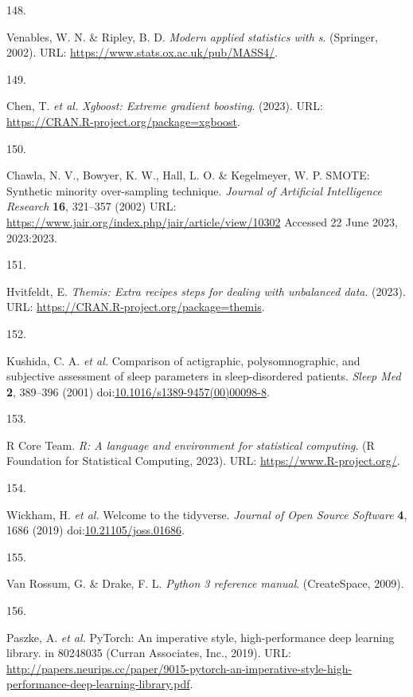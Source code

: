 \documentclass[
  10pt,
]{scrbook}
\newlength{\cslhangindent}
\newlength{\csllabelwidth}
\newlength{\cslentryspacingunit} %
\newenvironment{CSLReferences}[2] %
 {%
  \setlength{\parindent}{0pt}
  \ifodd #1
  \let\oldpar\par
  \def\par{\hangindent=\cslhangindent\oldpar}
  \fi
  \setlength{\parskip}{#2\cslentryspacingunit}
 }%
 {}
\newcommand{\CSLLeftMargin}[1]{\parbox[t]{\csllabelwidth}{#1}}
\newcommand{\CSLRightInline}[1]{\parbox[t]{\linewidth - \csllabelwidth}{#1}\break}
\begin{document}
\begin{CSLReferences}{0}{0}
\leavevmode{}%
\CSLLeftMargin{148. }%
\CSLRightInline{Venables, W. N. \& Ripley, B. D. \emph{Modern applied
statistics with s}. (Springer, 2002). URL:
\url{https://www.stats.ox.ac.uk/pub/MASS4/}.}

\leavevmode{}%
\CSLLeftMargin{149. }%
\CSLRightInline{Chen, T. \emph{et al.} \emph{Xgboost: Extreme gradient
boosting}. (2023). URL:
\url{https://CRAN.R-project.org/package=xgboost}.}

\leavevmode{}%
\CSLLeftMargin{150. }%
\CSLRightInline{Chawla, N. V., Bowyer, K. W., Hall, L. O. \& Kegelmeyer,
W. P. {SMOTE}: Synthetic minority over-sampling technique. \emph{Journal
of Artificial Intelligence Research} \textbf{16}, 321--357 (2002) URL:
\url{https://www.jair.org/index.php/jair/article/view/10302} Accessed 22
June 2023, 2023:2023.}

\leavevmode{}%
\CSLLeftMargin{151. }%
\CSLRightInline{Hvitfeldt, E. \emph{Themis: Extra recipes steps for
dealing with unbalanced data}. (2023). URL:
\url{https://CRAN.R-project.org/package=themis}.}

\leavevmode{}%
\CSLLeftMargin{152. }%
\CSLRightInline{Kushida, C. A. \emph{et al.} Comparison of actigraphic,
polysomnographic, and subjective assessment of sleep parameters in
sleep-disordered patients. \emph{Sleep Med} \textbf{2}, 389--396 (2001)
doi:\href{https://doi.org/10.1016/s1389-9457(00)00098-8}{10.1016/s1389-9457(00)00098-8}.}

\leavevmode{}%
\CSLLeftMargin{153. }%
\CSLRightInline{R Core Team. \emph{R: A language and environment for
statistical computing}. (R Foundation for Statistical Computing, 2023).
URL: \url{https://www.R-project.org/}.}

\leavevmode{}%
\CSLLeftMargin{154. }%
\CSLRightInline{Wickham, H. \emph{et al.} Welcome to the tidyverse.
\emph{Journal of Open Source Software} \textbf{4}, 1686 (2019)
doi:\href{https://doi.org/10.21105/joss.01686}{10.21105/joss.01686}.}

\leavevmode{}%
\CSLLeftMargin{155. }%
\CSLRightInline{Van Rossum, G. \& Drake, F. L. \emph{Python 3 reference
manual}. (CreateSpace, 2009).}

\leavevmode{}%
\CSLLeftMargin{156. }%
\CSLRightInline{Paszke, A. \emph{et al.} PyTorch: An imperative style,
high-performance deep learning library. in 80248035 (Curran Associates,
Inc., 2019). URL:
\url{http://papers.neurips.cc/paper/9015-pytorch-an-imperative-style-high-performance-deep-learning-library.pdf}.}


\end{CSLReferences}
\end{document}
